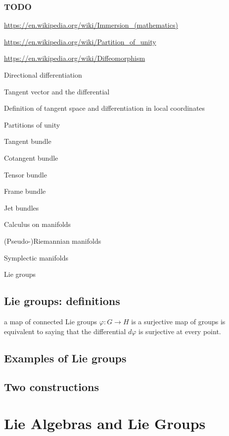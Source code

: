 \documentclass[12pt, letterpaper]{article}
\newcommand{\red}[1]{{\color{red} #1}}
\theoremstyle{definition}
\theoremstyle{remark}
\theoremstyle{definition}
\theoremstyle{plain}
\numberwithin{equation}{section}
\begin{document}
	\subsubsection{TODO}
	
	\url{https://en.wikipedia.org/wiki/Immersion_(mathematics)}
	

	\url{https://en.wikipedia.org/wiki/Partition_of_unity}
	
	\url{https://en.wikipedia.org/wiki/Diffeomorphism}

	\red{	Directional differentiation
		
		Tangent vector and the differential
		
		Definition of tangent space and differentiation in local coordinates
		
		Partitions of unity
		
		Tangent bundle
		
		Cotangent bundle
		
		Tensor bundle
		
		Frame bundle
		
		Jet bundles
		
		Calculus on manifolds
		
		(Pseudo-)Riemannian manifolds
		
		Symplectic manifolds
		
		Lie groups
	}
	
	\subsection{Lie groups: definitions}

	\red{a map of connected Lie 
	groups $\varphi\colon G\to H$ is a surjective map of groups is equivalent to saying that the 
	differential $d\varphi$ is surjective at every point.}
	
	\subsection{Examples of Lie groups}
	
	\subsection{Two constructions}
	
	\section{Lie Algebras and Lie Groups}
	
	\setcounter{subsection}{-1}
\end{document}
